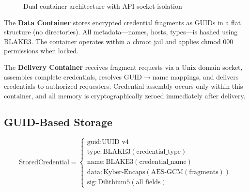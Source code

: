 \documentclass[11pt,a4paper]{article}
\begin{document}
\begin{figure}[h]
\centering
{}
\caption{Dual-container architecture with API socket isolation}
\end{figure}

The \textbf{Data Container} stores encrypted credential fragments as GUIDs in a flat structure (no directories). All metadata---names, hosts, types---is hashed using BLAKE3. The container operates within a chroot jail and applies chmod 000 permissions when locked.

The \textbf{Delivery Container} receives fragment requests via a Unix domain socket, assembles complete credentials, resolves GUID$\to$name mappings, and delivers credentials to authorized requesters. Credential assembly occurs only within this container, and all memory is cryptographically zeroed immediately after delivery.

\subsection{GUID-Based Storage}

\begin{equation}
\text{StoredCredential} = \left\{
\begin{array}{l}
\text{guid}: \text{UUID v4}\\
\text{type}: \text{BLAKE3}(\text{credential\_type})\\
\text{name}: \text{BLAKE3}(\text{credential\_name})\\
\text{data}: \text{Kyber-Encaps}(\text{AES-GCM}(\text{fragments}))\\
\text{sig}: \text{Dilithium5}(\text{all\_fields})
\end{array}
\right.
\end{equation}
\end{document}
